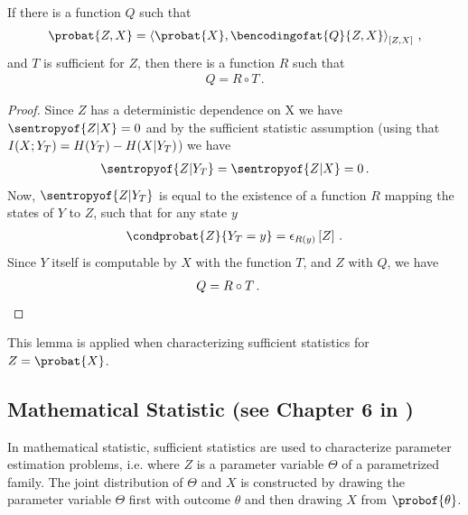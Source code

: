 \documentclass[aps,onecolumn,nofootinbib,pra]{article}
\begin{document}
    \begin{lemma}
        \label{lem:doubleDetSstat}
        If there is a function $Q$ such that
        \begin{align*}
            \probat{Z,X} = \contractionof{\probat{X},\bencodingofat{Q}{Z,X}}{Z,X} \, ,
        \end{align*}
        and $T$ is sufficient for $Z$, then there is a function $R$ such that
        \begin{align*}
            Q = R \circ T \, .
        \end{align*}
    \end{lemma}
    \begin{proof}
        Since $Z$ has a deterministic dependence on X we have $\sentropyof{Z|X} = 0$ and by the sufficient statistic assumption (using that $I(X;Y_{T}) = H(Y_{T})-H(X|Y_{T})$) we have
        \begin{align*}
            \sentropyof{Z|\headvariableof{T}} = \sentropyof{Z|X} = 0 \, .
        \end{align*}
        Now, $\sentropyof{Z|\headvariableof{T}}$ is equal to the existence of a function $R$ mapping the states of $Y$ to $Z$, such that for any state $y$
        \begin{align*}
            \condprobat{Z}{\headvariableof{T}=y} = \onehotmapofat{R(y)}{Z} \, .
        \end{align*}
        Since $Y$ itself is computable by $X$ with the function $T$, and $Z$ with $Q$, we have
        \begin{align*}
            Q = R \circ T \, . & \qedhere
        \end{align*}
    \end{proof}

    This lemma is applied when characterizing sufficient statistics for $Z = \probat{X}$.

    \subsection{Mathematical Statistic (see Chapter 6 in \cite{casella_statistical_2001})}

    In mathematical statistic, sufficient statistics are used to characterize parameter estimation problems, i.e. where $Z$ is a parameter variable $\Theta$ of a parametrized family.
    The joint distribution of $\Theta$ and $X$ is constructed by drawing the parameter variable $\Theta$ first with outcome $\theta$ and then drawing $X$ from $\probof{\theta}$.
\end{document}
